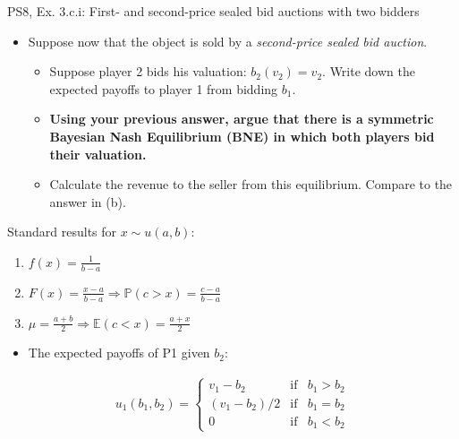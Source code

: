 \begin{frame}{PS8, Ex. 3.c.i: First- and second-price sealed bid auctions with two bidders}
    \begin{multicols}{2}
      \begin{itemize}
        \item[(c)] Suppose now that the object is sold by a \textit{second-price sealed bid auction}.
        \begin{itemize}\normalsize
          \item[i.]   Suppose player 2 bids his valuation: $b_2(v_2) = v_2$. Write down the expected payoffs to player 1 from bidding $b_1$.
          \item[ii.]  \textbf{Using your previous answer, argue that there is a symmetric Bayesian Nash Equilibrium (BNE) in which both players bid their valuation.}
          \item[iii.] Calculate the revenue to the seller from this equilibrium. Compare to the answer in (b).
        \end{itemize}
      \end{itemize}
      Standard results for $x\sim u(a, b):$
      \vspace{-6pt}
      \begin{enumerate}
        \item[PDF:] $f(x)=\frac{1}{b-a}$
        \item[CDF:] $F(x)=\frac{x-a}{b-a}\Rightarrow\mathbb{P}(c>x)=\frac{c-a}{b-a}$
        \item[Mean:] $\mu=\frac{a+b}{2}\Rightarrow\mathbb{E}(c<x)=\frac{a+x}{2}$
      \end{enumerate}
      \vfill\null\columnbreak
      \begin{itemize}
        \item[(i)] The expected payoffs of P1 given $b_2$:
      \end{itemize}
      \vspace{-12pt}
      \begin{align*}
        u_1(b_1,b_2)=\left\{\begin{array}{lcl}
          v_1-b_2     & \text{if} & b_1>b_2 \\
          (v_1-b_2)/2 & \text{if} & b_1=b_2 \\
          0           & \text{if} & b_1<b_2
        \end{array}\right.
      \end{align*}
      \vfill\null
    \end{multicols}
\end{frame}


